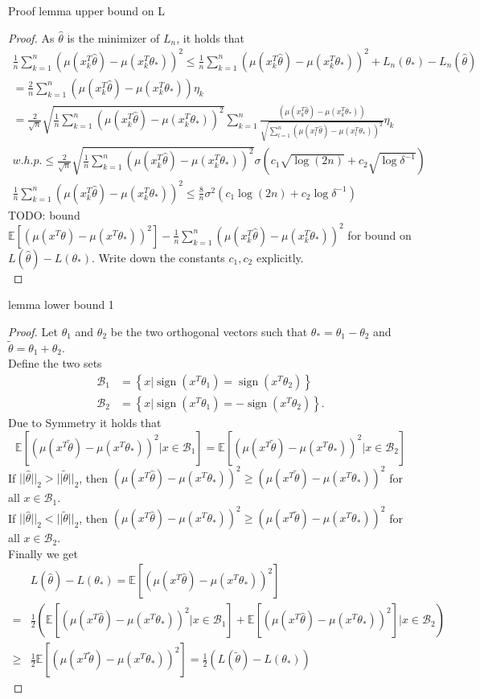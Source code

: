 \documentclass[twoside]{article} \usepackage{aistats2017}
\newcommand{\EV}[1] {
  \mathbb{E}\left[#1\right]}
\newcommand{\sign} {
  \operatorname{sign}}
\begin{document}
Proof lemma upper bound on L
\begin{proof}
    As $\hat{\theta}$ is the minimizer of $L_n$, it holds that
    \begin{align*}
        \frac{1}{n}\sum_{k=1}^n(\mu(x_k^T\hat{\theta})-\mu(x_k^T\theta_*))^2 \leq \frac{1}{n}\sum_{k=1}^n(\mu(x_k^T\hat{\theta})-\mu(x_k^T\theta_*))^2 + L_n(\theta_*)-L_n(\hat{\theta})\\
        = \frac{2}{n}\sum_{k=1}^n(\mu(x_k^T\hat{\theta})-\mu(x_k^T\theta_*))\eta_k\\
        = \frac{2}{\sqrt{n}}\sqrt{\frac{1}{n}\sum_{k=1}^n(\mu(x_k^T\hat{\theta})-\mu(x_k^T\theta_*))^2}\sum_{k=1}^n\frac{(\mu(x_k^T\hat{\theta})-\mu(x_k^T\theta_*))}{\sqrt{\sum_{l=1}^n(\mu(x_l^T\hat{\theta})-\mu(x_l^T\theta_*))^2}}\eta_k\\
        w.h.p. \leq   \frac{2}{\sqrt{n}}\sqrt{ \frac{1}{n}\sum_{k=1}^n(\mu(x_k^T\hat{\theta})-\mu(x_k^T\theta_*))^2 }\sigma(c_1\sqrt{\log(2n)}+c_2\sqrt{\log{\delta^{-1}}})\\
        \frac{1}{n}\sum_{k=1}^n(\mu(x_k^T\hat{\theta})-\mu(x_k^T\theta_*))^2 \leq \frac{8}{n}\sigma^2(c_1\log(2n)+c_2\log{\delta^{-1}})
    \end{align*}
    \color{red}TODO: bound $\EV{(\mu(x^T\theta)-\mu(x^T\theta_*))^2}-\frac{1}{n}\sum_{k=1}^n(\mu(x_k^T\hat{\theta})-\mu(x_k^T\theta_*))^2$ for bound on $L(\hat{\theta})-L(\theta_*)$. Write down the constants $c_1, c_2$ explicitly.\color{black}\\
\end{proof}
lemma lower bound 1
\begin{proof}
Let $\theta_1$ and $\theta_2$ be the two orthogonal vectors such that $\theta_* = \theta_1-\theta_2$ and $\tilde{\theta}=\theta_1+\theta_2$.\\
Define the two sets
\begin{align*}
\mathcal{B}_1 &= \left\{x|\sign(x^T\theta_1)=\sign(x^T\theta_2)\right\}\\ 
\mathcal{B}_2 &= \left\{x|\sign(x^T\theta_1)=-\sign(x^T\theta_2)\right\}.
\end{align*}
Due to Symmetry it holds that 
$$\EV{(\mu(x^T\tilde{\theta})-\mu(x^T\theta_*))^2|x\in\mathcal{B}_1}=\EV{(\mu(x^T\tilde{\theta})-\mu(x^T\theta_*))^2|x\in\mathcal{B}_2}$$
If $||\hat{\theta}||_2 > ||\tilde{\theta}||_2$, then $(\mu(x^T\hat{\theta})-\mu(x^T\theta_*))^2 \geq (\mu(x^T\tilde{\theta})-\mu(x^T\theta_*))^2$ for all $x\in \mathcal{B}_1$.\\
If $||\hat{\theta}||_2 < ||\tilde{\theta}||_2$, then $(\mu(x^T\hat{\theta})-\mu(x^T\theta_*))^2 \geq (\mu(x^T\tilde{\theta})-\mu(x^T\theta_*))^2$ for all $x\in \mathcal{B}_2$.\\
Finally we get
\begin{align*}
     &L(\hat{\theta})-L(\theta_*) = \EV{(\mu(x^T\hat{\theta})-\mu(x^T\theta_*))^2}\\
     =& \frac{1}{2}\left(\EV{(\mu(x^T\hat{\theta})-\mu(x^T\theta_*))^2|x\in\mathcal{B}_1}+\EV{(\mu(x^T\hat{\theta})-\mu(x^T\theta_*))^2}|x\in\mathcal{B}_2\right)\\
     \geq& \frac{1}{2}\EV{(\mu(x^T\tilde{\theta})-\mu(x^T\theta_*))^2}=\frac{1}{2}(L(\tilde{\theta})-L(\theta_*))
\end{align*}
\end{proof}
\end{document}
